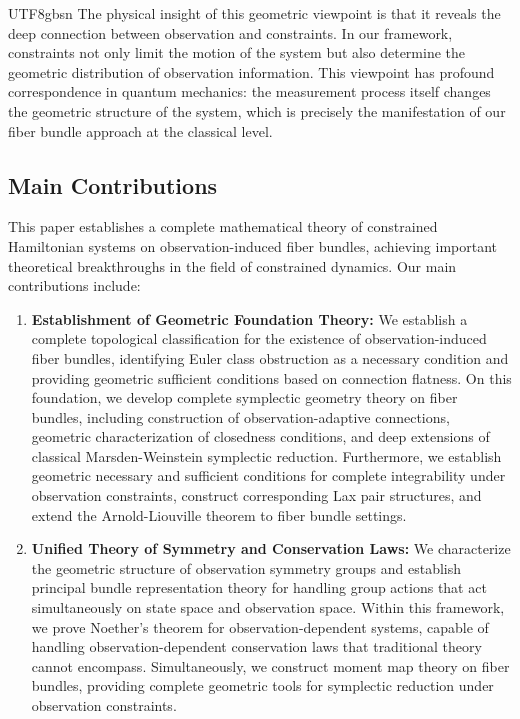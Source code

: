 \documentclass[a4paper,12pt]{extarticle}
\theoremstyle{definition}
\begin{document}
\begin{CJK}{UTF8}{gbsn}
The physical insight of this geometric viewpoint is that it reveals the deep connection between observation and constraints. In our framework, constraints not only limit the motion of the system but also determine the geometric distribution of observation information. This viewpoint has profound correspondence in quantum mechanics: the measurement process itself changes the geometric structure of the system, which is precisely the manifestation of our fiber bundle approach at the classical level.

\subsection{Main Contributions}

This paper establishes a complete mathematical theory of constrained Hamiltonian systems on observation-induced fiber bundles, achieving important theoretical breakthroughs in the field of constrained dynamics. Our main contributions include:

\begin{enumerate}
\item \textbf{Establishment of Geometric Foundation Theory:} We establish a complete topological classification for the existence of observation-induced fiber bundles, identifying Euler class obstruction as a necessary condition and providing geometric sufficient conditions based on connection flatness. On this foundation, we develop complete symplectic geometry theory on fiber bundles, including construction of observation-adaptive connections, geometric characterization of closedness conditions, and deep extensions of classical Marsden-Weinstein symplectic reduction\cite{marsden1974reduction}. Furthermore, we establish geometric necessary and sufficient conditions for complete integrability under observation constraints, construct corresponding Lax pair structures, and extend the Arnold-Liouville theorem\cite{arnold1989mathematical} to fiber bundle settings.

\item \textbf{Unified Theory of Symmetry and Conservation Laws:} We characterize the geometric structure of observation symmetry groups and establish principal bundle representation theory for handling group actions that act simultaneously on state space and observation space. Within this framework, we prove Noether's theorem\cite{noether1918invariante} for observation-dependent systems, capable of handling observation-dependent conservation laws that traditional theory cannot encompass. Simultaneously, we construct moment map theory on fiber bundles, providing complete geometric tools for symplectic reduction under observation constraints.


\end{enumerate}
\end{CJK}
\end{document}
